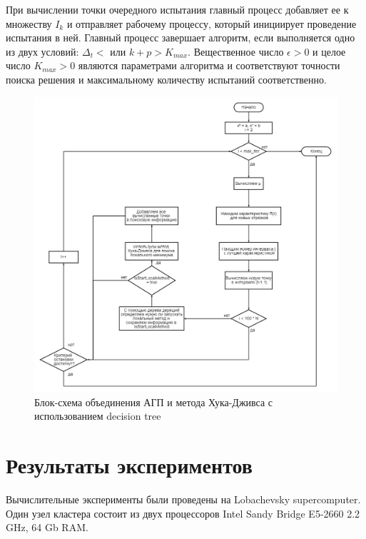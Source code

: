 \documentclass{svproc}
\begin{document}
При вычислении точки очередного испытания главный процесс добавляет ее к множеству $I_k$ и отправляет рабочему процессу, который инициирует проведение испытания в ней.
Главный процесс завершает алгоритм, если выполняется одно из двух условий: $\Delta_t<$ или $k+p>K_{max}$.
Вещественное число $\epsilon>0$ и целое число $K_{max}>0$ являются параметрами алгоритма и соответствуют точности поиска решения и максимальному количеству испытаний соответственно.

\begin{figure}[ht!]

	\begin{center}
		\begin{minipage}[h]{0.9\linewidth}
			\includegraphics[width=1\linewidth]{figure/fig3.png}
			\caption{Блок-схема объединения АГП и метода Хука-Дживса с использованием decision tree} %
			\label{fig:fig3}
		\end{minipage}
	\end{center}
\end{figure}


\section{Результаты экспериментов}\label{SecR}


Вычислительные эксперименты были проведены на Lobachevsky supercomputer. Один узел кластера состоит из двух процессоров Intel Sandy Bridge E5-2660 2.2 GHz, 64 Gb RAM. 
\end{document}
